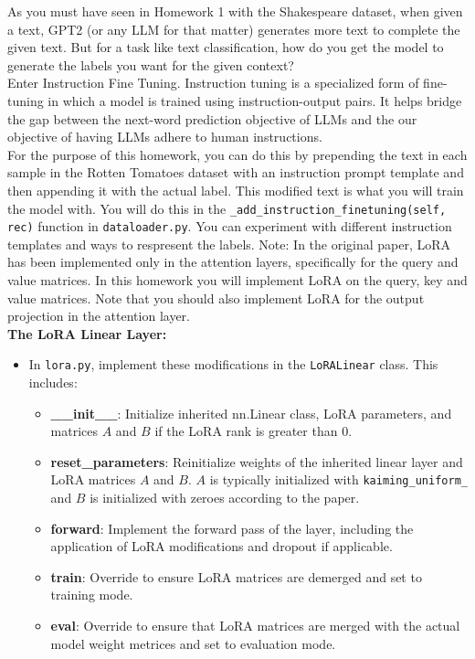 \documentclass[11pt,addpoints,answers]{exam}
\begin{document}
\begin{questions}
As you must have seen in Homework 1 with the Shakespeare dataset, when given a text, GPT2 (or any LLM for that matter) generates more text to complete the given text. But for a task like text classification, how do you get the model to generate the labels you want for the given context? \\
Enter Instruction Fine Tuning. Instruction tuning is a specialized form of fine-tuning in which a model is trained using instruction-output pairs. It helps bridge the gap between the next-word prediction objective of LLMs and the our objective of having LLMs adhere to human instructions.\\
For the purpose of this homework, you can do this by prepending the text in each sample in the Rotten Tomatoes dataset with an instruction prompt template and then appending it with the actual label. This modified text is what you will train the model with. You will do this in the \texttt{\_add\_instruction\_finetuning(self, rec)} function in \texttt{dataloader.py}. You can experiment with different instruction templates and ways to respresent the labels.
Note: In the original paper, LoRA has been implemented only in the attention layers, specifically for the query and value matrices. In this homework you will implement LoRA on the query, key and value matrices. Note that you should also implement LoRA for the output projection in the attention layer.\\
\textbf{The LoRA Linear Layer:}

\begin{itemize}
    \item In \texttt{lora.py}, implement these modifications in the \texttt{LoRALinear} class. This includes:
    \begin{itemize}
        \item \textbf{\_\_init\_\_}: Initialize inherited nn.Linear class, LoRA parameters, and matrices \(A\) and \(B\) if the LoRA rank is greater than 0.
        \item \textbf{reset\_parameters}: Reinitialize weights of the inherited linear layer and LoRA matrices \(A\) and \(B\). \(A\) is typically initialized with \texttt{kaiming\_uniform\_} and \(B\) is initialized with zeroes according to the paper.
        \item \textbf{forward}: Implement the forward pass of the layer, including the application of LoRA modifications and dropout if applicable.
        \item \textbf{train}: Override to ensure LoRA matrices are demerged and set to training mode.
        \item \textbf{eval}: Override to ensure that LoRA matrices are merged with the actual model weight metrices and set to evaluation mode.


\end{itemize}
\end{itemize}
\end{questions}
\end{document}
